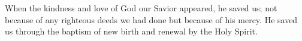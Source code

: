 \lettrine[lines=3]{W}{}hen the kindness and love of God our Savior appeared, he saved us; not because of any righteous deeds we had done but because of his mercy. He saved us through the baptism of new birth and renewal by the Holy Spirit.
